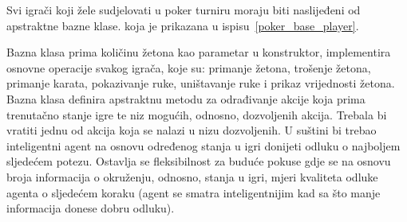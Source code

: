 
Svi igrači koji žele sudjelovati u poker turniru moraju biti naslijeđeni od apstraktne bazne klase.  koja je prikazana u ispisu~\ref{poker_base_player}. 


Bazna klasa prima količinu žetona kao parametar u konstruktor, implementira osnovne operacije svakog igrača, koje su: primanje žetona, trošenje žetona, primanje karata, pokazivanje ruke, uništavanje ruke i prikaz vrijednosti žetona. Bazna klasa definira apstraktnu metodu  za odrađivanje akcije koja prima trenutačno stanje igre te niz mogućih, odnosno, dozvoljenih akcija. Trebala bi vratiti jednu od akcija koja se nalazi u nizu dozvoljenih. U suštini bi trebao inteligentni agent na osnovu određenog stanja u igri donijeti odluku o najboljem sljedećem potezu. Ostavlja se fleksibilnost za buduće pokuse gdje se na osnovu broja informacija o okruženju, odnosno, stanja u igri, mjeri kvaliteta odluke agenta o sljedećem koraku (agent se smatra inteligentnijim kad sa što manje informacija donese dobru odluku). 

